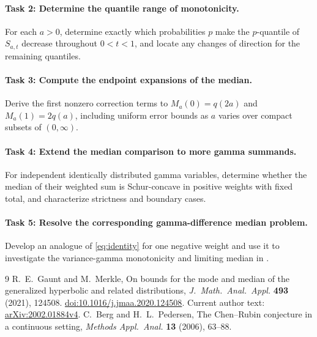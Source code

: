 \documentclass[11pt]{article}
\begin{document}
\paragraph{Task 2: Determine the quantile range of monotonicity.}
For each \(a>0\), determine exactly which probabilities \(p\) make the
\(p\)-quantile of \(S_{a,t}\) decrease throughout \(0<t<1\), and locate
any changes of direction for the remaining quantiles.

\paragraph{Task 3: Compute the endpoint expansions of the median.}
Derive the first nonzero correction terms to \(M_a(0)=q(2a)\) and
\(M_a(1)=2q(a)\), including uniform error bounds as \(a\) varies over
compact subsets of \((0,\infty)\).

\paragraph{Task 4: Extend the median comparison to more gamma summands.}
For independent identically distributed gamma variables, determine
whether the median of their weighted sum is Schur-concave in positive
weights with fixed total, and characterize strictness and boundary cases.

\paragraph{Task 5: Resolve the corresponding gamma-difference median problem.}
Develop an analogue of \eqref{eq:identity} for one negative weight and
use it to investigate the variance-gamma monotonicity and limiting
median in \cite[Conjectures 3.3 and 3.5]{GM}.

\begin{thebibliography}{9}
R.\ E.\ Gaunt and M.\ Merkle,
On bounds for the mode and median of the generalized hyperbolic and
related distributions,
\emph{J.\ Math.\ Anal.\ Appl.} \textbf{493} (2021), 124508.
\href{https://doi.org/10.1016/j.jmaa.2020.124508}{doi:10.1016/j.jmaa.2020.124508}.
Current author text:
\href{https://arxiv.org/abs/2002.01884}{arXiv:2002.01884v4}.
C.\ Berg and H.\ L.\ Pedersen,
The Chen--Rubin conjecture in a continuous setting,
\emph{Methods Appl.\ Anal.} \textbf{13} (2006), 63--88.
\end{thebibliography}
\end{document}
